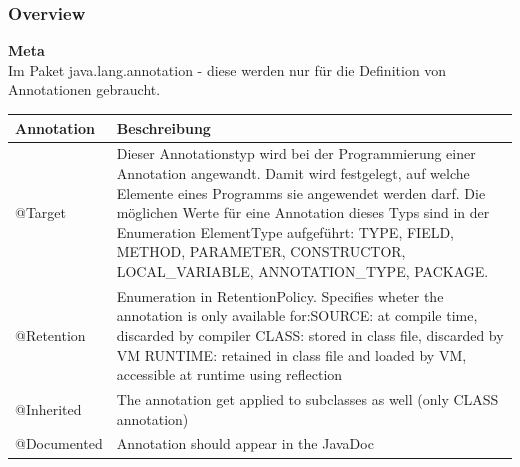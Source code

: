 \documentclass[10pt]{article}
\begin{document}
\subsubsection{Overview}
\textbf{Meta}\\
Im Paket java.lang.annotation - diese werden nur für die Definition von Annotationen gebraucht.\\
\begin{tabular}{| l | p{15cm} |}
\hline
Annotation & Beschreibung \\ \hline
@Target & Dieser Annotationstyp wird bei der Programmierung einer Annotation angewandt. Damit wird festgelegt, auf welche Elemente eines Programms sie angewendet werden darf. Die möglichen Werte für eine Annotation dieses Typs sind in der Enumeration ElementType aufgeführt: TYPE, FIELD, METHOD, PARAMETER, CONSTRUCTOR, LOCAL\_VARIABLE, ANNOTATION\_TYPE, PACKAGE.\\ \hline
@Retention & Enumeration in RetentionPolicy. Specifies wheter the annotation is only available for:\newline SOURCE: at compile time, discarded by compiler \newline CLASS: stored in class file, discarded by VM \newline RUNTIME: retained in class file and loaded by VM, accessible at runtime using reflection \\ \hline
@Inherited & The annotation get applied to subclasses as well (only CLASS annotation)\\ \hline
@Documented & Annotation should appear in the JavaDoc\\ \hline
\end{tabular}\\
\end{document}

